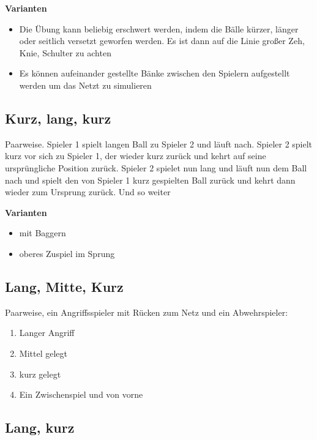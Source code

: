 \documentclass[]{book}
\providecommand{\tightlist}{%
  \setlength{\itemsep}{0pt}\setlength{\parskip}{0pt}}
\begin{document}
\textbf{Varianten}

\begin{itemize}
\item
  Die Übung kann beliebig erschwert werden, indem die Bälle kürzer,
  länger oder seitlich versetzt geworfen werden. Es ist dann auf die
  Linie großer Zeh, Knie, Schulter zu achten
\item
  Es können aufeinander gestellte Bänke zwischen den Spielern
  aufgestellt werden um das Netzt zu simulieren
\end{itemize}

\subsection{Kurz, lang, kurz}\label{kurz-lang-kurz}

Paarweise. Spieler 1 spielt langen Ball zu Spieler 2 und läuft nach.
Spieler 2 spielt kurz vor sich zu Spieler 1, der wieder kurz zurück und
kehrt auf seine ursprüngliche Position zurück. Spieler 2 spielet nun
lang und läuft nun dem Ball nach und spielt den von Spieler 1 kurz
gespielten Ball zurück und kehrt dann wieder zum Ursprung zurück. Und so
weiter

\textbf{Varianten}

\begin{itemize}
\tightlist
\item
  mit Baggern
\item
  oberes Zuspiel im Sprung
\end{itemize}

\subsection{Lang, Mitte, Kurz}\label{lang-mitte-kurz}

Paarweise, ein Angriffsspieler mit Rücken zum Netz und ein
Abwehrspieler:

\begin{enumerate}
\def\labelenumi{\arabic{enumi}.}
\tightlist
\item
  Langer Angriff
\item
  Mittel gelegt
\item
  kurz gelegt
\item
  Ein Zwischenspiel und von vorne
\end{enumerate}

\subsection{Lang, kurz}\label{lang-kurz}
\end{document}
